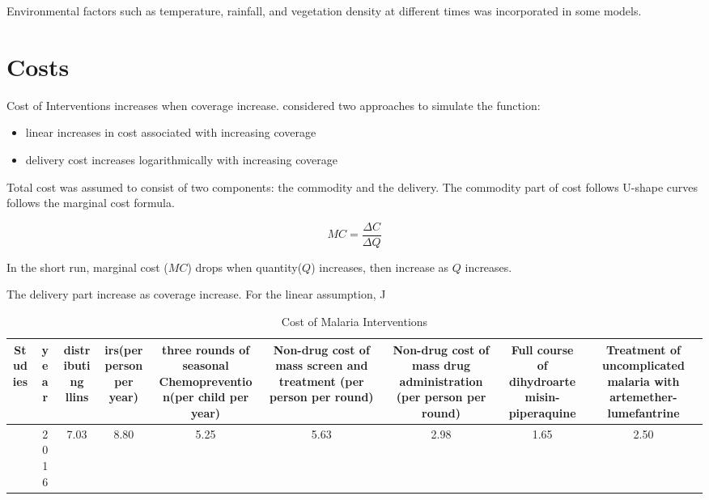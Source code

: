 \documentclass[a4paper, 12pt, twoside]{article}
\begin{document}
Environmental factors such as temperature, rainfall, and vegetation density\cite{Gomez-Elipe2007} at different times was incorporated in some models.


\section{Costs}
Cost of Interventions increases when coverage increase.\cite{Winskill2017a} considered two approaches to simulate the function:
\begin{itemize}
	\item linear increases in cost associated with increasing coverage
	\item delivery cost increases logarithmically with increasing coverage
\end{itemize}

Total cost was assumed to consist of two components: the commodity and the delivery. The commodity part of cost follows U-shape curves follows the marginal cost formula.

$$ MC = \frac{\Delta C}{\Delta Q} $$

In the short run, marginal cost ($MC$) drops when quantity($Q$) increases, then increase as $Q$ increases.

The delivery part increase as coverage increase. For the linear assumption, J

\begin{table}[htpb]
	\centering
	\caption{Cost of Malaria Interventions}
	\label{tab:cost_of_malaria_interventions}
	{\small
		\begin{tabular}{cSSSSSSSS}
			\toprule
			Studies           & {year} & {distributing \gls{llins}} & {\gls{irs}(per person per year)} & {three rounds of seasonal Chemoprevention(per child per year) } & {Non-drug cost of mass screen and treatment (per person per round)} & {Non-drug cost of mass drug administration (per person per round) } & {Full course of dihydroartemisin-piperaquine} & {Treatment of uncomplicated malaria with artemether-lumefantrine} \\
			\midrule
			\cite{Walker2016} & 2016   & 7.03                       & 8.80                             & 5.25                                                            & 5.63                                                                & 2.98                                                                & 1.65                                          & 2.50                                                              \\
			\bottomrule
		\end{tabular}
	}
\end{table}
\end{document}
